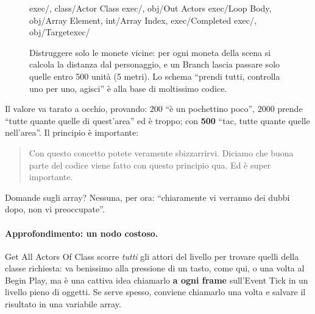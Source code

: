\begin{figure}[htbp]
\centering
\begin{bpgraph}
    {exec/, class/Actor Class }{exec/, obj/Out Actors}
    {exec/Loop Body, obj/Array Element, int/Array Index, exec/Completed}
    {exec/, obj/Target}{exec/}
\end{bpgraph}
\caption{Distruggere solo le monete vicine: per ogni moneta della scena si
calcola la distanza dal personaggio, e un Branch lascia passare solo quelle
entro 500 unità (5 metri). Lo schema ``prendi tutti, controlla uno per uno,
agisci'' è alla base di moltissimo codice.}
\label{gd12:fig:distanza}
\end{figure}

Il valore va tarato a occhio, provando: 200 ``è un pochettino poco'', 2000
prende ``tutte quante quelle di quest'area'' ed è troppo; con \textbf{500}
``tac, tutte quante quelle nell'area''. Il principio è importante:
\begin{quote}
Con questo concetto potete veramente sbizzarrirvi. Diciamo che buona parte del
codice viene fatto con questo principio qua. Ed è super importante.
\end{quote}
Domande sugli array? Nessuna, per ora: ``chiaramente vi verranno dei dubbi
dopo, non vi preoccupate''.

\paragraph{Approfondimento: un nodo costoso.} Get All Actors Of Class scorre
\emph{tutti} gli attori del livello per trovare quelli della classe richiesta:
va benissimo alla pressione di un tasto, come qui, o una volta al Begin Play,
ma è una cattiva idea chiamarlo \textbf{a ogni frame} sull'Event Tick in un
livello pieno di oggetti. Se serve spesso, conviene chiamarlo una volta e
salvare il risultato in una variabile array.

